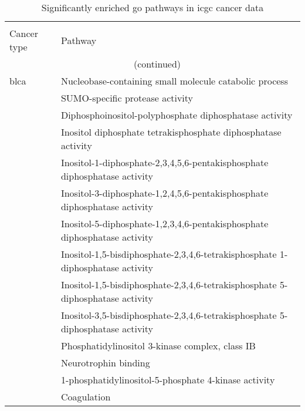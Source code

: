 \begin{appendices}
	\begin{longtable}{lp{}}
		\centering
		\caption{Significantly enriched \gls{go} pathways in \gls{icgc} cancer data}
		\label{tab:sig_path_go}\\
		Cancer type & Pathway\\
		\hline
		\hline
		\endfirsthead
		\multicolumn{2}{c}{\tablename\ \thetable{}\ (continued)} \\
		\hline
		\hline
		\endhead
		\rule{0pt}{2.25ex}\gls{blca} & Nucleobase-containing small molecule catabolic process                                          \\
									 & SUMO-specific protease activity                                                                 \\
									 & Diphosphoinositol-polyphosphate diphosphatase activity                                          \\
									 & Inositol diphosphate tetrakisphosphate diphosphatase activity                                   \\
									 & Inositol-1-diphosphate-2,3,4,5,6-pentakisphosphate diphosphatase activity                       \\
									 & Inositol-3-diphosphate-1,2,4,5,6-pentakisphosphate diphosphatase activity                       \\
									 & Inositol-5-diphosphate-1,2,3,4,6-pentakisphosphate diphosphatase activity                       \\
									 & Inositol-1,5-bisdiphosphate-2,3,4,6-tetrakisphosphate 1-diphosphatase activity                  \\
									 & Inositol-1,5-bisdiphosphate-2,3,4,6-tetrakisphosphate 5-diphosphatase activity                  \\
									 & Inositol-3,5-bisdiphosphate-2,3,4,6-tetrakisphosphate 5-diphosphatase activity                  \\
									 & Phosphatidylinositol 3-kinase complex, class IB                                                 \\
									 & Neurotrophin binding                                                                            \\
									 & 1-phosphatidylinositol-5-phosphate 4-kinase activity                                            \\
									 & Coagulation                                                                                     \\

\end{longtable}
\end{appendices}

